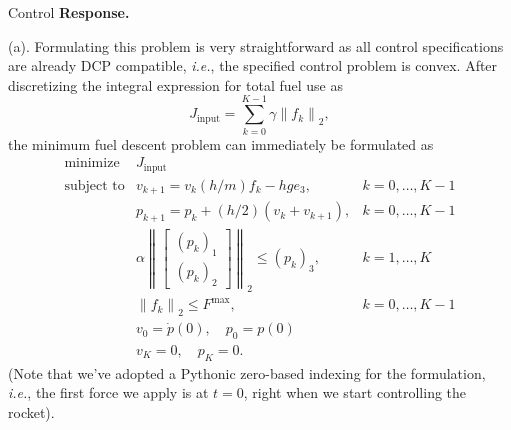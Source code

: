 \begin{chapter}{Control}
    \vspace{0.2cm}
    \noindent \textbf{Response.} 
    
    \noindent (a). Formulating this problem is very straightforward as all
    control specifications are already DCP compatible, \textit{i.e.}, the specified control
    problem is convex. After discretizing the integral expression for total fuel use as
    \[J_{\mathrm{input}} = \sum_{k=0}^{K-1}\gamma \left\lVert f_k \right\rVert_{2},\]
    the minimum fuel descent problem can immediately be formulated as
    \[\begin{array}{lll}
    \text{minimize} \; & J_{\mathrm{input}} & \\
    \text{subject to} & v_{k+1} = v_k (h/m)f_k - hge_3, & k = 0, \ldots, K-1 \\
    & p_{k+1} = p_k + (h/2)(v_k + v_{k+1}), & k = 0, \ldots, K-1 \\
    & \alpha \left\lVert \begin{bmatrix} (p_k)_1 \\ (p_k)_2 \end{bmatrix} \right\rVert_{2} \le (p_k)_3, & k=1, \ldots, K \\
    & \left\lVert f_k \right\rVert_{2} \le F^{\mathrm{max}}, & k = 0, \ldots, K-1 \\
    & v_{0} = \dot{p}(0), \quad p_0 = p(0) & \\
    & v_{K} = 0, \quad p_{K} = 0.
    \end{array}\]
    (Note that we've adopted a Pythonic zero-based indexing for the formulation, \textit{i.e.},
    the first force we apply is at $t=0$, right when we start controlling the rocket).


\end{chapter}
